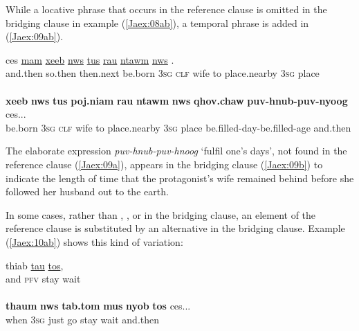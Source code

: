 \documentclass[output=paper]{LSP/langsci}
\begin{document}
While a locative phrase that occurs in the reference clause is omitted in the bridging clause in example (\ref{Jaex:08ab}), a temporal phrase is added in (\ref{Jaex:09ab}).


\begin{exe}
\ex \label{Jaex:09ab}
\begin{xlist}
\ex \label{Jaex:09a}
\gll ces  \underline{} \underline{mam} \underline{xeeb} \underline{nws} \underline{tus} \underline{} \underline{rau} \underline{ntawm} \underline{nws} \underline{}.\\
and.then so.then  then.next be.born \textsc{3sg} \textsc{clf} wife to place.nearby \textsc{3sg} place \\
\glt {}\\
\ex \label{Jaex:09b}
\gll \textbf{xeeb} \textbf{nws} \textbf{tus} \textbf{poj.niam} \textbf{rau} \textbf{ntawm} \textbf{nws} \textbf{qhov.chaw} \textbf{puv-hnub-puv-nyoog}  ces...\\     	      
     be.born \textsc{3sg} \textsc{clf} wife to place.nearby \textsc{3sg} place be.filled-day-be.filled-age and.then\\
\glt {} \citep[][3]{johnson92}
\end{xlist}
\end{exe}

\noindent
The elaborate expression \textit{puv-hnub-puv-hnoog} `fulfil one’s days', not found in the reference clause (\ref{Jaex:09a}), appears in the bridging clause (\ref{Jaex:09b}) to indicate the length of time that the protagonist’s wife remained behind before she followed her husband out to the earth.
 
 
In some cases, rather than , , or  in the bridging clause, an element of the reference clause is substituted by an alternative in the bridging clause. Example (\ref{Jaex:10ab}) shows this kind of variation:
 
%
%

\begin{exe}
\ex \label{Jaex:10ab}
\begin{xlist}
\ex \label{Jaex:10a}
\gll thiab  \underline{tau} \underline{} \underline{tos},\\
and \textsc{pfv} stay wait\\
\glt {}\\
\ex \label{Jaex:10b}
\gll \textbf{thaum} \textbf{nws} \textbf{tab.tom} \textbf{mus} \textbf{nyob} \textbf{tos} ces...\\     	      
     when \textsc{3sg} just go stay wait and.then\\
\glt {} \citep[][28]{vang90}
\end{xlist}
\end{exe}
\end{document}
